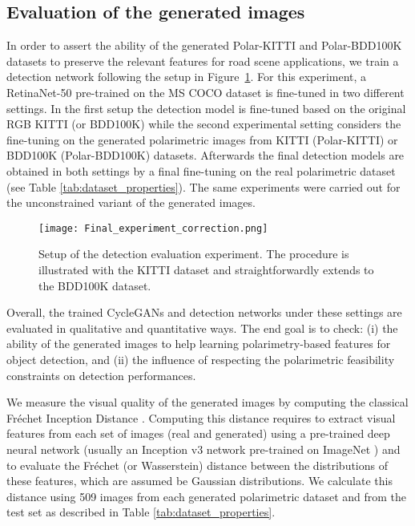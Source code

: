 \subsection{Evaluation of the generated images} \label{subsec:eval_gen_img}
In order to assert the ability of the generated Polar-KITTI and Polar-BDD100K datasets to preserve the relevant features for road scene applications, we train a detection network following the setup in Figure~\ref{fig:experimental_setup}. For this experiment, a RetinaNet-50 \citep{Lin2017} pre-trained on the MS COCO dataset \citep{Lin2014} is fine-tuned in two different settings. In the first setup the detection model is fine-tuned based on the original RGB KITTI (or BDD100K) while the second experimental setting considers the fine-tuning on the generated polarimetric images from KITTI (Polar-KITTI) or BDD100K (Polar-BDD100K) datasets. Afterwards the final detection models are obtained in both settings by a final fine-tuning on the real polarimetric dataset (see Table \ref{tab:dataset_properties}). The same experiments were carried out for the unconstrained variant of the generated images.

\begin{figure}
	\centering
	\texttt{[image: Final\_experiment\_correction.png]}
	\caption{Setup of the detection evaluation experiment. The procedure is illustrated with the KITTI dataset and straightforwardly extends to the BDD100K dataset.}
	\label{fig:experimental_setup}
\end{figure}

Overall, the trained CycleGANs and detection networks under these settings are evaluated in qualitative and quantitative ways. The end goal is to check: (i) the ability of the generated images to help learning polarimetry-based features for object detection, and (ii) the influence of respecting the polarimetric feasibility constraints on detection performances.

We  measure the visual quality of the generated images by computing the classical Fréchet Inception Distance \citep{Heusel2017}. Computing this distance requires to extract visual features from each set of images (real and generated) using a pre-trained deep neural network (usually an Inception v3 \citep{Szegedy2016} network pre-trained on ImageNet \citep{Deng2009}) and to evaluate the Fréchet (or Wasserstein) distance between the distributions of these features, which are assumed be Gaussian distributions. We calculate this distance using 509 images from each generated polarimetric dataset and from the test set as described in Table \ref{tab:dataset_properties}.

